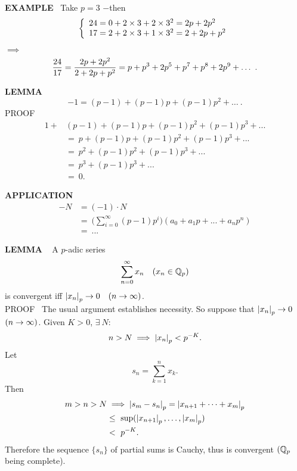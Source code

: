 \begin{x}{\small\bf EXAMPLE} \ 
Take $p = 3$ $-$then
\[\left\{
\begin{array}{l l}
24 = 0 +  2 \times 3 + 2 \times 3^2 = 2p + 2p^2\\
17 = 2 + 2 \times 3 + 1 \times 3^2 = 2 + 2p + p^2
\end{array}
\right.\]

\indent\indent $\implies$	
\[
\displaystyle\frac{24}{17}  = \displaystyle\frac{2p + 2p^2}{2 + 2p + p^2} = p + p^3 + 2p^5 + p^7 + p^8 + 2p^9 + \dots \ .
\]
\end{x}
\vspace{0.1cm}


\begin{x}{\small\bf LEMMA} \ 
\[
			-1= (p-1) + (p-1)p + (p-1)p^2 + \dots \ .
\]
\indent PROOF \ 
\[
\begin{aligned}
1 + &(p-1) + (p-1)p + (p-1)p^2 + (p-1)p^3 + ...\\
&= \ p + (p-1)p + (p-1)p^2 + (p-1)p^3 + ... \\
&= \ p^2 + (p-1)p^2 + (p-1)p^3 + ... \\
&= \ p^3 + (p-1)p^3 + ... \\
&= \ 0.
\end{aligned}
\]
\end{x}
\vspace{0.1cm}

\begin{x}{\small\bf APPLICATION} \ 
\[
\begin{aligned}
-N &= (-1) \cdot N \\
&= \ \bigl(\sum_{i=0}^\infty (p-1) p^i \bigr) (a_0 + a_1p + ... + a_np^n) \\
&= \ ...
\end{aligned}
\]
\end{x}
\vspace{0.1cm}

\begin{x}{\small\bf LEMMA} \  %
A $p$-adic series
\[
\sum_{n=0}^\infty x_n  	 \quad (x_{n}  \in \mathbb{Q}_{p}) 
\]
is convergent iff 
$\left\vert x_n\right\vert_{p} \rightarrow 0  \quad (n  \rightarrow  \infty)$.\\ 

\indent PROOF \ 
The usual argument establishes necessity.
So suppose that $\left\vert x_n\right\vert_p  \rightarrow  0$  $(n  \rightarrow  \infty)$.  
Given $K  >  0$, $\exists \  N$:
\[
n > N \implies \left\vert x_n\right\vert_{p} < p^{-K}.
\]
Let
\[
s_n = \sum_{k=1}^n x_k.
\]
Then
\[
\begin{aligned}
m > n > N 
&\implies \left\vert s_m - s_n\right\vert_{p} = \left\vert x_{n+1} + \dots + x_m\right\vert_{p}\\
&\le \  \sup(\left\vert x_{n+1}\right\vert_{p}, \dots, \left\vert x_m\right\vert_{p})\\
&<  \ p^{-K}.
\end{aligned}
\]
Therefore the sequence $\{s_n\}$ of partial sums is Cauchy, thus is convergent $(\mathbb{Q}_{p}$ being complete).\\
\end{x}

